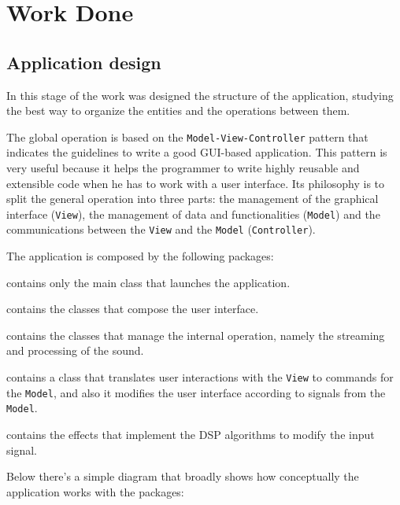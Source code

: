 \chapter{Work Done}

\section{Application design}  %
In this stage of the work was designed the structure of the application,
studying the best way to organize the entities and the operations
between them.


The global operation is based on the \texttt{Model-View-Controller}
pattern that indicates the guidelines to write a good GUI-based
application. This pattern is very useful because it helps the programmer
to write highly reusable and extensible code when he has to work with
a user interface. Its philosophy is to split the general operation into
three parts: the management of the graphical interface (\texttt{View}), the
management of data and functionalities (\texttt{Model}) and the
communications between the \texttt{View} and the \texttt{Model}
(\texttt{Controller}).

\vspace{0.2in}

The application is composed by the following packages:
\begin{description}[noitemsep]
  \item[Main:] contains only the main class that launches the
    application.
  \item[View:] contains the classes that compose the user
    interface.
  \item[Model:] contains the classes that manage the internal
    operation, namely the streaming and processing of the sound.
  \item[Controller:] contains a class that translates user
    interactions with the \texttt{View} to commands for the \texttt{Model}, and also it
    modifies the user interface according to signals from the \texttt{Model}.
  \item[Effects:] contains the effects that implement the DSP
    algorithms to modify the input signal.
\end{description}

\newpage
Below there's a simple diagram that broadly shows how conceptually the
application works with the packages:

